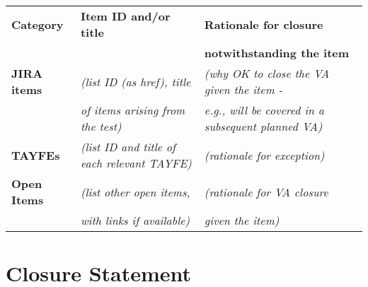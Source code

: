 \documentclass[TR]{spherex}
\begin{document}
\begin{longtable}{|l|p{}|p{}|}
\hline
\textbf{Category} & \textbf{Item ID and/or title} & \textbf{Rationale for closure} \\
 & & \textbf{notwithstanding the item} \\ \hline\hline
\endhead
\textbf{JIRA items} & \textit{(list ID (as href), title} & \textit{(why OK to close the VA given the item -} \\
 & \textit{of items arising from the test)} & \textit{e.g., will be covered in a subsequent planned VA)} \\
\hline
\textbf{TAYFEs} & \textit{(list ID and title of each relevant TAYFE)} & \textit{(rationale for exception)} \\
\hline
\textbf{Open Items} & \textit{(list other open items,} & \textit{(rationale for VA closure} \\
 & \textit{with links if available)} & \textit{given the item)} \\
\hline
\end{longtable}

\section{Closure Statement}

%



\end{document}
